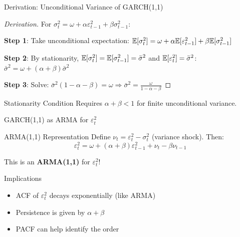 \documentclass[9pt, aspectratio=169, t]{beamer}
\begin{document}
\begin{frame}{Derivation: Unconditional Variance of GARCH(1,1)}
\small
    \begin{proof}[Derivation]
        For $\sigma_t^2 = \omega + \alpha \varepsilon_{t-1}^2 + \beta \sigma_{t-1}^2$:

        \textbf{Step 1}: Take unconditional expectation:
        $\mathbb{E}[\sigma_t^2] = \omega + \alpha \mathbb{E}[\varepsilon_{t-1}^2] + \beta \mathbb{E}[\sigma_{t-1}^2]$

        \textbf{Step 2}: By stationarity, $\mathbb{E}[\sigma_t^2] = \mathbb{E}[\sigma_{t-1}^2] = \bar{\sigma}^2$ and $\mathbb{E}[\varepsilon_t^2] = \bar{\sigma}^2$:
        $\bar{\sigma}^2 = \omega + (\alpha + \beta) \bar{\sigma}^2$

        \textbf{Step 3}: Solve: $\bar{\sigma}^2 (1 - \alpha - \beta) = \omega \Rightarrow \boxed{\bar{\sigma}^2 = \frac{\omega}{1 - \alpha - \beta}}$
    \end{proof}
    \vspace{-0.1cm}
    \begin{alertblock}{Stationarity Condition}
        Requires $\alpha + \beta < 1$ for finite unconditional variance.
    \end{alertblock}
\end{frame}

\begin{frame}{GARCH(1,1) as ARMA for $\varepsilon_t^2$}
    \vspace{-0.2cm}
    {\footnotesize
    \begin{block}{ARMA(1,1) Representation}
        Define $\nu_t = \varepsilon_t^2 - \sigma_t^2$ (variance shock). Then:
        \[
            \varepsilon_t^2 = \omega + (\alpha + \beta) \varepsilon_{t-1}^2 + \nu_t - \beta \nu_{t-1}
        \]

        This is an \textbf{ARMA(1,1)} for $\varepsilon_t^2$!
    \end{block}

    \vspace{0.3cm}

    \begin{exampleblock}{Implications}
        \begin{itemize}\setlength{\itemsep}{0pt}
            \item ACF of $\varepsilon_t^2$ decays exponentially (like ARMA)
            \item Persistence is given by $\alpha + \beta$
            \item PACF can help identify the order
        \end{itemize}
    \end{exampleblock}
    }
\end{frame}
\end{document}
